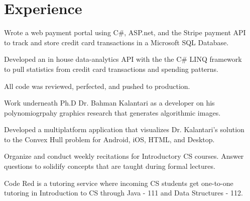 \documentclass[]{deedy-resume-openfont}
\begin{document}
\hfill
\begin{minipage}[t]{0.66\textwidth} 


\section{Experience}

\vspace{\topsep} %
\begin{tightemize}
\item Wrote a web payment portal using C\#, ASP.net, and the Stripe payment API \\to track and store credit card transactions in a Microsoft SQL Database.
\item Developed an in house data-analytics API with the the C\# LINQ framework \\to pull statistics from credit card transactions and spending patterns. 
\item All code was reviewed, perfected, and pushed to production.
\end{tightemize}
\sectionsep

\begin{tightemize}
\item Work underneath Ph.D Dr. Bahman Kalantari as a developer on his polynomiogrpahy graphics research that generates algorithmic images.  
\item Developed a multiplatform application that visualizes Dr. Kalantari's solution \\ to the Convex Hull problem for Android, iOS, HTML, and Desktop. 
\end{tightemize}
\sectionsep

\begin{tightemize}
\item Organize and conduct weekly recitations for Introductory CS courses. Answer questions to solidify concepts that are taught during formal lectures. 
\item Code Red is a tutoring service where incoming CS students get one-to-one tutoring in Introduction to CS through Java - 111 and Data Structures - 112. 
\end{tightemize}
\sectionsep


\end{minipage}
\end{document}
